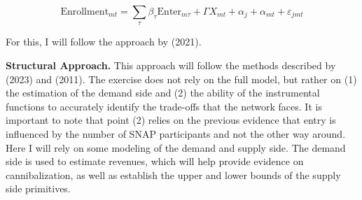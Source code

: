 \documentclass[11pt]{article}
\begin{document}


\[\text{Enrollment}_{mt} =  \sum_{\tau} \beta_{\tau}  \text{Enter}_{m\tau} +  \Gamma X_{mt} + \alpha_{j} + \alpha_{mt} + \varepsilon_{jmt}\]


For this, I will follow the approach by \citeauthor{callaway2021difference} (2021). 

\textbf{Structural Approach.} This approach will follow the methods described by \citeauthor{houde2023nexus} (2023) and \citeauthor{holmes2011diffusion} (2011). The exercise does not rely on the full model, but rather on (1) the estimation of the demand side and (2) the ability of the instrumental functions to accurately identify the trade-offs that the network faces. It is important to note that point (2) relies on the previous evidence that entry is influenced by the number of SNAP participants and not the other way around. Here I will rely on some modeling of the demand and supply side. The demand side is used to estimate revenues, which will help provide evidence on cannibalization, as well as establish the upper and lower bounds of the supply side primitives.

\end{document}
